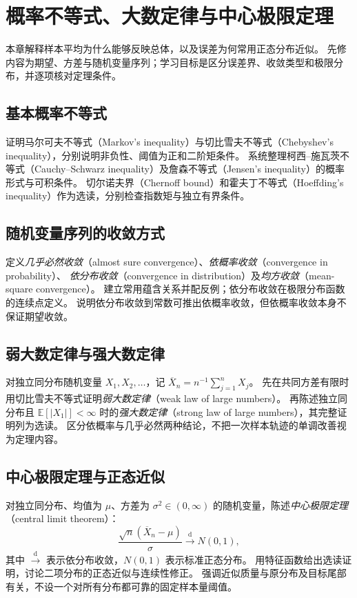 \setcounter{chapter}{8} %
\chapter{概率不等式、大数定律与中心极限定理}
\label{chap:ps-limits}

本章解释样本平均为什么能够反映总体，以及误差为何常用正态分布近似。
先修内容为期望、方差与随机变量序列；学习目标是区分误差界、收敛类型和极限分布，并逐项核对定理条件。

\section{基本概率不等式}
\label{sec:ps-probability-inequalities}
证明马尔可夫不等式（Markov's inequality）与切比雪夫不等式（Chebyshev's inequality），分别说明非负性、阈值为正和二阶矩条件。
系统整理柯西--施瓦茨不等式（Cauchy--Schwarz inequality）及詹森不等式（Jensen's inequality）的概率形式与可积条件。
切尔诺夫界（Chernoff bound）和霍夫丁不等式（Hoeffding's inequality）作为选读，分别检查指数矩与独立有界条件。

\section{随机变量序列的收敛方式}
\label{sec:ps-convergence-modes}
定义\emph{几乎必然收敛}（almost sure convergence）、\emph{依概率收敛}（convergence in probability）、
\emph{依分布收敛}（convergence in distribution）及\emph{均方收敛}（mean-square convergence）。
建立常用蕴含关系并配反例；依分布收敛在极限分布函数的连续点定义。
说明依分布收敛到常数可推出依概率收敛，但依概率收敛本身不保证期望收敛。

\section{弱大数定律与强大数定律}
\label{sec:ps-laws-large-numbers}
对独立同分布随机变量 $X_1,X_2,\ldots$，记 $\overline X_n=n^{-1}\sum_{j=1}^nX_j$。
先在共同方差有限时用切比雪夫不等式证明\emph{弱大数定律}（weak law of large numbers）。
再陈述独立同分布且 $\mathbb E[|X_1|]<\infty$ 时的\emph{强大数定律}（strong law of large numbers），其完整证明列为选读。
区分依概率与几乎必然两种结论，不把一次样本轨迹的单调改善视为定理内容。

\section{中心极限定理与正态近似}
\label{sec:ps-central-limit}
对独立同分布、均值为 $\mu$、方差为 $\sigma^2\in(0,\infty)$ 的随机变量，陈述\emph{中心极限定理}（central limit theorem）：
\begin{equation}
  \frac{\sqrt n(\overline X_n-\mu)}{\sigma}
  \xrightarrow{\mathrm d} N(0,1),
  \label{eq:ps-clt}
\end{equation}
其中 $\xrightarrow{\mathrm d}$ 表示依分布收敛，$N(0,1)$ 表示标准正态分布。
用特征函数给出选读证明，讨论二项分布的正态近似与连续性修正。
强调近似质量与原分布及目标尾部有关，不设一个对所有分布都可靠的固定样本量阈值。

